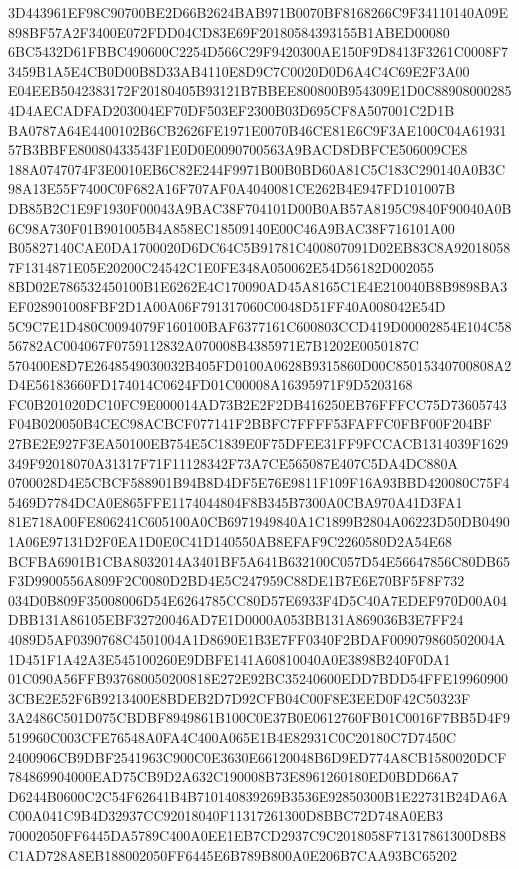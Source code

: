 \documentclass[UTF8,fontset=fandol,zihao=-4,a4paper]{ctexart}
\begin{document}
{{3D443961EF98C90700BE2D66B2624BAB971B0070BF8168266C9F34110140A09E898BF57A2F3400E072FDD04CD83E69F20180584393155B1ABED00080
6BC5432D61FBBC490600C2254D566C29F9420300AE150F9D8413F3261C0008F73459B1A5E4CB0D00B8D33AB4110E8D9C7C0020D0D6A4C4C69E2F3A00
E04EEB5042383172F20180405B93121B7BBEE800800B954309E1D0C889080002854D4AECADFAD203004EF70DF503EF2300B03D695CF8A507001C2D1B
BA0787A64E4400102B6CB2626FE1971E0070B46CE81E6C9F3AE100C04A6193157B3BBFE80080433543F1E0D0E0090700563A9BACD8DBFCE506009CE8
188A0747074F3E0010EB6C82E244F9971B00B0BD60A81C5C183C290140A0B3C98A13E55F7400C0F682A16F707AF0A4040081CE262B4E947FD101007B
DB85B2C1E9F1930F00043A9BAC38F704101D00B0AB57A8195C9840F90040A0B6C98A730F01B901005B4A858EC18509140E00C46A9BAC38F716101A00
B05827140CAE0DA1700020D6DC64C5B91781C400807091D02EB83C8A920180587F1314871E05E20200C24542C1E0FE348A050062E54D56182D002055
8BD02E786532450100B1E6262E4C170090AD45A8165C1E4E210040B8B9898BA3EF028901008FBF2D1A00A06F791317060C0048D51FF40A008042E54D
5C9C7E1D480C0094079F160100BAF6377161C600803CCD419D00002854E104C5856782AC004067F0759112832A070008B4385971E7B1202E0050187C
570400E8D7E2648549030032B405FD0100A0628B9315860D00C85015340700808A2D4E56183660FD174014C0624FD01C00008A16395971F9D5203168
FC0B201020DC10FC9E000014AD73B2E2F2DB416250EB76FFFCC75D73605743F04B020050B4CEC98ACBCF077141F2BBFC7FFFF53FAFFC0FBF00F204BF
27BE2E927F3EA50100EB754E5C1839E0F75DFEE31FF9FCCACB1314039F1629349F92018070A31317F71F11128342F73A7CE565087E407C5DA4DC880A
0700028D4E5CBCF588901B94B8D4DF5E76E9811F109F16A93BBD420080C75F45469D7784DCA0E865FFE1174044804F8B345B7300A0CBA970A41D3FA1
81E718A00FE806241C605100A0CB6971949840A1C1899B2804A06223D50DB04901A06E97131D2F0EA1D0E0C41D140550AB8EFAF9C2260580D2A54E68
BCFBA6901B1CBA8032014A3401BF5A641B632100C057D54E56647856C80DB65F3D9900556A809F2C0080D2BD4E5C247959C88DE1B7E6E70BF5F8F732
034D0B809F35008006D54E6264785CC80D57E6933F4D5C40A7EDEF970D00A04DBB131A86105EBF32720046AD7E1D0000A053BB131A869036B3E7FF24
4089D5AF0390768C4501004A1D8690E1B3E7FF0340F2BDAF009079860502004A1D451F1A42A3E545100260E9DBFE141A60810040A0E3898B240F0DA1
01C090A56FFB937680050200818E272E92BC35240600EDD7BDD54FFE199609003CBE2E52F6B9213400E8BDEB2D7D92CFB04C00F8E3EED0F42C50323F
3A2486C501D075CBDBF8949861B100C0E37B0E0612760FB01C0016F7BB5D4F9519960C003CFE76548A0FA4C400A065E1B4E82931C0C20180C7D7450C
2400906CB9DBF2541963C900C0E3630E66120048B6D9ED774A8CB1580020DCF784869904000EAD75CB9D2A632C190008B73E8961260180ED0BDD66A7
D6244B0600C2C54F62641B4B710140839269B3536E92850300B1E22731B24DA6AC00A041C9B4D32937CC92018040F11317261300D8BBC72D748A0EB3
70002050FF6445DA5789C400A0EE1EB7CD2937C9C2018058F71317861300D8B8C1AD728A8EB188002050FF6445E6B789B800A0E206B7CAA93BC65202
}}
\end{document}
